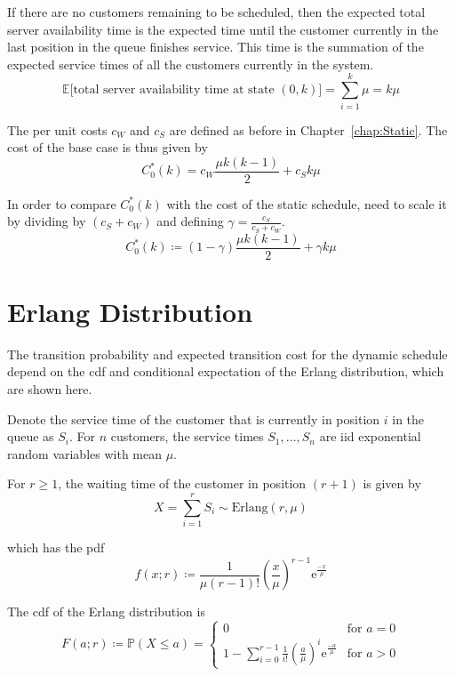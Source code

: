 If there are no customers remaining to be scheduled, then the expected total server availability time is the expected time until the customer currently in the last position in the queue finishes service. This time is the summation of the expected service times of all the customers currently in the system.
\begin{equation}
	\mathbb{E} \Big[\text{total server availability time at state $(0, k)$} \Big] = \sum_{i = 1}^{k} \mu = k \mu
\end{equation}

The per unit costs $c_{W}$ and $c_{S}$ are defined as before in Chapter~\ref{chap:Static}. The cost of the base case is thus given by
\begin{equation}
 	C_{0}^{*} (k) = c_{W} \frac{\mu k (k - 1)}{2} + c_{S} k \mu
\end{equation}

In order to compare $C_{0}^{*} (k)$ with the cost of the static schedule, need to scale it by dividing by $(c_{S} + c_{W})$ and defining $\gamma = \frac{c_{S}}{c_{S} + c_{W}}$.
\begin{equation}
	C_{0}^{*} (k) \coloneqq (1 - \gamma) \frac{\mu k (k - 1)}{2} + \gamma k \mu
\end{equation}

\section{Erlang Distribution}
The transition probability and expected transition cost for the dynamic schedule depend on the cdf and conditional expectation of the Erlang distribution, which are shown here.

Denote the service time of the customer that is currently in position $i$ in the queue as $S_{i}$. For $n$ customers, the service times $S_{1}, \ldots, S_{n}$ are iid exponential random variables with mean $\mu$.

For $r \geq 1$, the waiting time of the customer in position $(r + 1)$ is given by
\begin{equation}
	X = \sum_{i = 1}^{r} S_{i} \sim \text{Erlang}(r, \mu)
\end{equation}

which has the pdf
\begin{equation}
	f (x; r) \coloneqq \frac{1}{\mu (r - 1)!} \left( \frac{x}{\mu} \right)^{r - 1} \mathrm{e}^{\frac{-x}{\mu}}
\end{equation}

The cdf of the Erlang distribution is
\begin{equation}
	F (a; r) \coloneqq \mathbb{P} (X \leq a) = \begin{cases} 0 & \text{for $a = 0$} \\ 1 - \sum_{i = 0}^{r - 1} \frac{1}{i!} \left( \frac{a}{\mu} \right)^{i} \mathrm{e}^{\frac{-a}{\mu}} & \text{for $a > 0$} \end{cases}
\end{equation}

